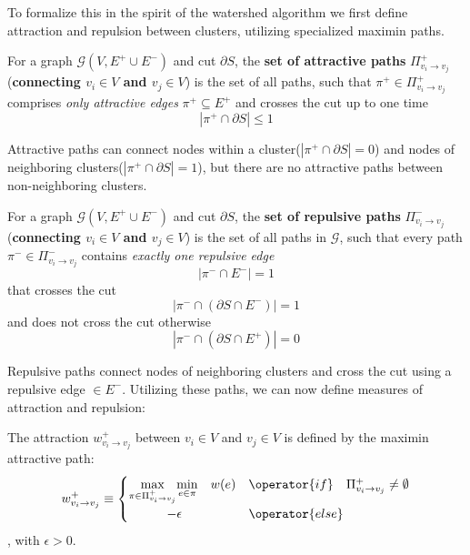 \noindent To formalize this in the spirit of the watershed algorithm we first define attraction and repulsion between clusters, utilizing specialized maximin paths. 
\begin{definition} For a graph $\mathcal{G}(V,E^{+}\cup E^{-})$ and cut $\partial S$, the \textbf{set of attractive paths }$\Pi_{v_{i}\rightarrow v_{j}}^{+}$ (\textbf{connecting $v_{i} \in V$ and $v_{j} \in V$}) is the set of all paths, such that $\pi^+ \in \Pi_{v_{i}\rightarrow v_{j}}^{+}$ comprises \textit{only attractive edges} $\pi^+ \subseteq E^{+}$ and crosses the cut up to one time 
\begin{equation}
|\pi^+ \cap \partial S| \le 1\label{eq:attr_def_1}
\end{equation}
\end{definition}
Attractive paths can connect nodes within a cluster($|\pi^+ \cap \partial S| = 0$) and nodes of neighboring clusters($|\pi^+ \cap \partial S| = 1$), but there are no attractive paths between non-neighboring clusters.
\begin{definition} For a graph $\mathcal{G}(V,E^{+}\cup E^{-})$ and cut $\partial S$, the \textbf{set of repulsive paths }$\Pi_{v_{i}\rightarrow v_{j}}^{-}$ (\textbf{connecting $v_{i} \in V$ and $v_{j} \in V$}) is the set of all paths in $\mathcal{G}$, such that every path $\pi^- \in \Pi_{v_{i}\rightarrow v_{j}}^{-}$ contains \textit{exactly one repulsive edge} \begin{equation}\left|\pi^-\cap E^{-}\right|=1\label{eq:rep_def_2}\end{equation} that crosses the cut \begin{equation}\left|\pi^-\cap (\partial S \cap E^{-})\right|=1\label{eq:rep_def_2}\end{equation} and does not cross the cut otherwise \begin{equation}
|\pi^- \cap (\partial S \cap E^{+})| = 0\label{eq:attr_def_2}
\end{equation}
\end{definition}

Repulsive paths connect nodes of neighboring clusters and cross the cut using a repulsive edge $\in E^-$.
Utilizing these paths, we can now define measures of  attraction and repulsion:
\begin{definition}[Attraction] The attraction $w_{v_{i}\rightarrow v_{j}}^{+}$ between $v_i\in V$ and $v_j \in V$ is defined by the maximin attractive path:
\begin{equation}
w_{v_{i}\rightarrow v_{j}}^{+}\equiv\begin{cases}
\underset{\pi \in \Pi_{v_{i}\rightarrow v_{j}}^{+}}{\max} \underset{e \in \pi}{\min} \quad w(e) & \operator{if}\quad\Pi_{v_{i}\rightarrow v_{j}}^{+}\neq\emptyset\\
\quad\quad\quad-\epsilon & \operator{else}
\end{cases}\label{eq:maximin_weight_a}
\end{equation}, with $\epsilon > 0$.
\end{definition}


